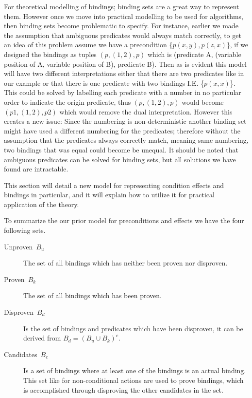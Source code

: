 \documentclass[../Master.tex]{subfiles}
\begin{document}
For theoretical modelling of bindings; binding sets are a great way to represent them. 
However once we move into practical modelling to be used for algorithms, then binding sets become problematic to specify. 
For instance, earlier we made the assumption that ambiguous predicates would always match correctly, to get an idea of this problem 
assume we have a precondition \{$p(x,y), p(z,x)$\}, if we designed the bindings as tuples $(p,(1,2),p)$ which is (predicate A, (variable position of A, variable position of B), predicate B). 
Then as is evident this model will have two different interpretations either that there are two predicates like in our example or that there is one predicate with two bindings I.E. \{$p(x,x)$\}.
This could be solved by labelling each predicate with a number in no particular order  to indicate the origin predicate, thus $(p,(1,2),p)$ would become  $(p1,(1,2),p2)$ which would remove the dual interpretation.
However this creates a new issue: Since the numbering is non-deterministic another binding set might have used a different numbering for the predicates; 
therefore without the assumption that the predicates always correctly match, meaning same numbering, two bindings that was equal could become be unequal.
It should be noted that ambiguous predicates can be solved for binding sets, but all solutions we have found are intractable.

This section will detail a new model for representing condition effects and bindings in particular, and it will explain how to utilize it for practical application of the theory.

To summarize the our prior model for preconditions and effects we have the four following sets.
\begin{description}
	\item [{Unproven~$B_u$}] The set of all bindings which has
	neither been proven nor disproven. 
	\item [{Proven~$B_k$}] The set of all bindings which has been
	proven.
	\item [{Disproven~$B_d$}] Is the set of bindings and predicates which have
	been disproven, it can be derived from $B_d=\left(B_u\cup B_k\right)^{c}$.
	\item [{Candidates~$B_c$}] Is a set of bindings where at least one of the bindings is an actual binding.
	This set like for non-conditional actions are used to prove bindings,
	which is accomplished through disproving the other candidates in the set.
\end{description}
\end{document}
